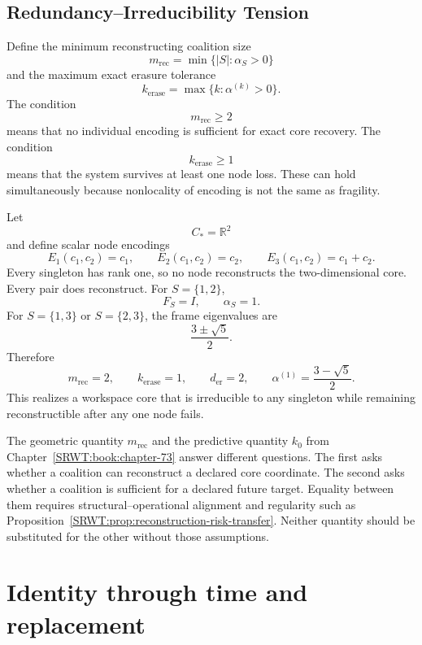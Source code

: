 \section{Redundancy--Irreducibility Tension}

Define the minimum reconstructing coalition size
\[
\boxed{
m_{\mathrm{rec}}
=
\min\{|S|:\alpha_S>0\}
}
\]
and the maximum exact erasure tolerance
\[
\boxed{
k_{\mathrm{erase}}
=
\max\{k:\alpha^{(k)}>0\}.
}
\]
The condition
\[
m_{\mathrm{rec}}\geq2
\]
means that no individual encoding is sufficient for exact core recovery. The
condition
\[
k_{\mathrm{erase}}\geq1
\]
means that the system survives at least one node loss. These can hold
simultaneously because nonlocality of encoding is not the same as fragility.


Let
\[
C_*=\mathbb R^2
\]
and define scalar node encodings
\[
E_1(c_1,c_2)=c_1,
\qquad
E_2(c_1,c_2)=c_2,
\qquad
E_3(c_1,c_2)=c_1+c_2.
\]
Every singleton has rank one, so no node reconstructs the two-dimensional
core. Every pair does reconstruct. For \(S=\{1,2\}\),
\[
F_S=I,
\qquad
\alpha_S=1.
\]
For \(S=\{1,3\}\) or \(S=\{2,3\}\), the frame eigenvalues are
\[
\frac{3\pm\sqrt5}{2}.
\]
Therefore
\[
\boxed{
m_{\mathrm{rec}}=2,
\qquad
k_{\mathrm{erase}}=1,
\qquad
d_{\mathrm{er}}=2,
\qquad
\alpha^{(1)}=\frac{3-\sqrt5}{2}.
}
\]
This realizes a workspace core that is irreducible to any singleton while
remaining reconstructible after any one node fails.


The geometric quantity \(m_{\mathrm{rec}}\) and the predictive quantity
\(k_0\) from Chapter~\ref{SRWT:book:chapter-73} answer different questions. The first asks whether a
coalition can reconstruct a declared core coordinate. The second asks whether
a coalition is sufficient for a declared future target. Equality between them
requires structural--operational alignment and regularity such as
Proposition~\ref{SRWT:prop:reconstruction-risk-transfer}. Neither quantity should
be substituted for the other without those assumptions.


\chapter{Identity through time and replacement}\label{SRWT:book:chapter-78}


